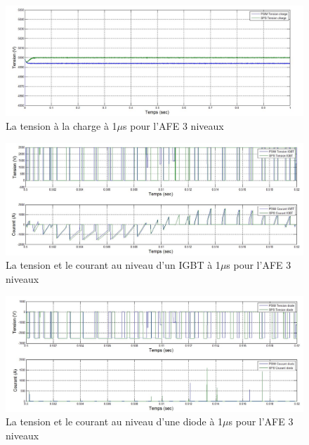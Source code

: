 \documentclass[11pt,letterpaper,final]{report}
\begin{document}
\begin{figure}[htb]
\centering
\includegraphics[scale=0.5]{Fig/AFE3LEVEL/1u/vch.jpg}
\caption{La tension à la charge à 1$\mu$s pour l'AFE 3 niveaux}
\label{AF_3_vch}
\end{figure}


\begin{figure}[htb]
\centering
\includegraphics[scale=0.5]{Fig/AFE3LEVEL/1u/IGBT.jpg}
\caption{La tension et le courant au niveau d'un IGBT à 1$\mu$s pour l'AFE 3 niveaux}
\label{AF_3_IGBT}
\end{figure}

\begin{figure}[htb]
\centering
\includegraphics[scale=0.5]{Fig/AFE3LEVEL/1u/DIODE.jpg}
\caption{La tension et le courant au niveau d'une diode à 1$\mu$s pour l'AFE 3 niveaux}
\label{AF_3_DIODE}
\end{figure}


\clearpage
\end{document}
